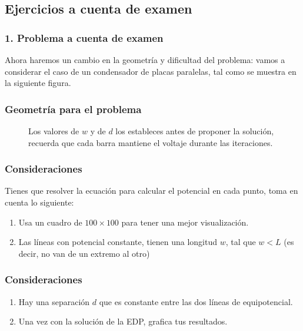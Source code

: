 \documentclass[12pt]{beamer}
\begin{document}
\subsection{Ejercicios a cuenta de examen}
\begin{frame}
\frametitle{1. Problema a cuenta de examen}
Ahora haremos un cambio en la geometría y dificultad del problema: vamos a considerar el caso de un condensador de placas paralelas, tal como se muestra en  la siguiente figura.
\end{frame}
\begin{frame}
\frametitle{Geometría para el problema}
\begin{figure}
	\centering
	
	\caption{Los valores de $w$ y de $d$ los estableces antes de proponer la solución, recuerda que cada barra mantiene el voltaje durante las iteraciones.}
\end{figure}
\end{frame}
\begin{frame}
\frametitle{Consideraciones}
Tienes que resolver la ecuación para calcular el potencial en cada punto, toma en cuenta lo siguiente:
\begin{enumerate}[<+->]
\item Usa un cuadro de $100 \times 100$ para tener una mejor visualización.
\item Las líneas con potencial constante, tienen una longitud $w$, tal que $w<L$  (es decir, no van de un extremo al otro)
\seti
\end{enumerate}
\end{frame}
\begin{frame}
\frametitle{Consideraciones}
\begin{enumerate}[<+->]
\conti
\item Hay una separación $d$ que es constante entre las dos líneas de equipotencial.
\item Una vez con la solución de la EDP, grafica tus resultados.
\end{enumerate}
\end{frame}
\end{document}
